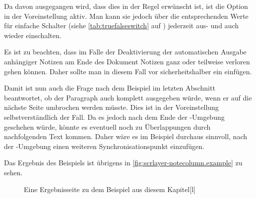 Da davon ausgegangen wird, dass dies in der Regel erwünscht ist, ist die
Option in der Voreinstellung aktiv. Man kann sie jedoch über die
entsprechenden Werte für einfache Schalter (siehe
\autoref{tab:truefalseswitch} auf ) jederzeit
aus- und auch wieder einschalten.

Es ist zu beachten, dass im Falle der Deaktivierung der
automatischen Ausgabe anhängiger Notizen am Ende des Dokument Notizen ganz
oder teilweise verloren gehen können. Daher sollte man in diesem Fall vor
 sicherheitshalber ein
 einfügen.

Damit ist nun auch die Frage nach dem Beispiel im letzten Abschnitt
beantwortet, ob der Paragraph auch komplett ausgegeben würde, wenn er auf die
nächste Seite umbrochen werden müsste. Dies ist in der Voreinstellung
selbstverständlich der Fall. Da es jedoch nach dem Ende der
-Umgebung geschehen würde, könnte es eventuell
noch zu Überlappungen durch nachfolgenden Text kommen. Daher wäre es im
Beispiel durchaus sinnvoll, nach der -Umgebung
einen weiteren Synchronisationspunkt einzufügen.

Das Ergebnis des Beispiels ist übrigens in
\autoref{fig:scrlayer-notecolumn.example} zu sehen.

\begin{figure}
  \setcapindent{0pt}%
  \begin{captionbeside}{Eine Ergebnisseite zu dem Beispiel
      aus diesem Kapitel\label{fig:scrlayer-notecolumn.example}}[l]
  \end{captionbeside}
\end{figure}
\EndIndexGroup
%
\EndIndexGroup




